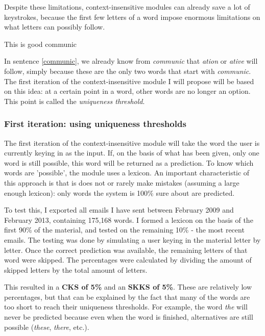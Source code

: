 \documentclass[12pt]{article}
\begin{document}
Despite these limitations, context-insensitive modules can already save a lot of keystrokes, because the first few letters of a word impose enormous limitations on what letters can possibly follow.

\begin{examples}
\item This is good communic \label{communic}
\end{examples}

In sentence \ref{communic}, we already know from \emph{communic} that \emph{ation} or \emph{ative} will follow, simply because these are the only two words that start with \emph{communic}. The first iteration of the context-insensitive module I will propose will be based on this idea: at a certain point in a word, other words are no longer an option. This point is called the \emph{uniqueness threshold}.

\subsubsection{First iteration: using uniqueness thresholds}

The first iteration of the context-insensitive module will take the word the user is currently keying in as the input. If, on the basis of what has been given, only one word is still possible, this word will be returned as a prediction. To know which words are 'possible', the module uses a lexicon. An important characteristic of this approach is that is does not or rarely make mistakes (assuming a large enough lexicon): only words the system is 100\% sure about are predicted.

To test this, I exported all emails I have sent between February 2009 and February 2013, containing 175,168 words. I formed a lexicon on the basis of the first 90\% of the material, and tested on the remaining 10\% - the most recent emails. The testing was done by simulating a user keying in the material letter by letter. Once the correct prediction was available, the remaining letters of that word were skipped. The percentages were calculated by dividing the amount of skipped letters by the total amount of letters.

This resulted in a \textbf{CKS of 5\%} and an \textbf{SKKS of 5\%}. These are relatively low percentages, but that can be explained by the fact that many of the words are too short to reach their uniqueness thresholds. For example, the word \emph{the} will never be predicted because even when the word is finished, alternatives are still possible (\emph{these}, \emph{there}, etc.).
\end{document}
